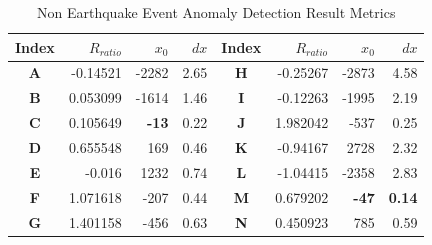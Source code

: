 \documentclass[3p,authoryear,preprint,12pt]{elsarticle}
\begin{document}
\begin{table}[htbp]
	\caption{Non Earthquake Event Anomaly Detection Result Metrics}
	\label{tab:Non Earthquake Event Anomaly Detection Result Metrics}
	\centering
	\begin{tabular}{crrr|crrr}
		\toprule
		\textbf{Index}& $R_{ratio}$ & $x_0$ & $dx$   &   \textbf{Index}   & $R_{ratio}$ & $x_0$ &  $dx$   \\
		\midrule
		\textbf{A} & -0.14521    & -2282 & 2.65 & \textbf{H} & -0.25267    & -2873 & 4.58 \\
		\textbf{B} & 0.053099    & -1614 & 1.46 & \textbf{I} & -0.12263    & -1995 & 2.19 \\
		\textbf{C} & 0.105649    & \textbf{-13}   & 0.22 & \textbf{J} & 1.982042    & -537  & 0.25 \\
		\textbf{D} & 0.655548    & 169   & 0.46 & \textbf{K} & -0.94167    & 2728  & 2.32 \\
		\textbf{E} & -0.016      & 1232  & 0.74 & \textbf{L} & -1.04415    & -2358 & 2.83 \\
		\textbf{F} & 1.071618    & -207  & 0.44 & \textbf{M} & 0.679202    & \textbf{-47}   &\textbf{ 0.14 }\\
		\textbf{G} & 1.401158    & -456  & 0.63 & \textbf{N} & 0.450923    & 785   & 0.59 \\
		\bottomrule
	\end{tabular}
\end{table}
\end{document}
